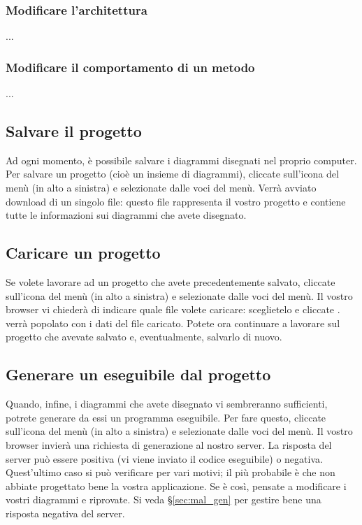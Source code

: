 \subsubsection{Modificare l'architettura}
...

\subsubsection{Modificare il comportamento di un metodo}
...



\subsection{Salvare il progetto} \label{sec:save} %

Ad ogni momento, è possibile salvare i diagrammi disegnati nel proprio computer. Per salvare un progetto (cioè un insieme di diagrammi), cliccate sull'icona del menù (in alto a sinistra) e selezionate  dalle voci del menù. Verrà avviato download di un singolo file: questo file rappresenta il vostro progetto e contiene tutte le informazioni sui diagrammi che avete disegnato.



\subsection{Caricare un progetto} \label{sec:load}

Se volete lavorare ad un progetto che avete precedentemente salvato, cliccate sull'icona del menù (in alto a sinistra) e selezionate  dalle voci del menù. Il vostro browser vi chiederà di indicare quale file volete caricare: sceglietelo e cliccate . \proj{} verrà popolato con i dati del file caricato. Potete ora continuare a lavorare sul progetto che avevate salvato e, eventualmente, salvarlo di nuovo.



\subsection{Generare un eseguibile dal progetto} \label{sec:gen}

Quando, infine, i diagrammi che avete disegnato vi sembreranno sufficienti, potrete generare da essi un programma eseguibile. Per fare questo, cliccate sull'icona del menù (in alto a sinistra) e selezionate  dalle voci del menù. Il vostro browser invierà una richiesta di generazione al nostro server. La risposta del server può essere positiva (vi viene inviato il codice eseguibile) o negativa. Quest'ultimo caso si può verificare per vari motivi; il più probabile è che non abbiate progettato bene la vostra applicazione. Se è così, pensate a modificare i vostri diagrammi e riprovate. Si veda §\ref{sec:mal_gen} per gestire bene una risposta negativa del server.





